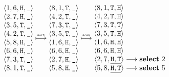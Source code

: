 \begin{align*}
  \begin{matrix}
    \langle 1, 6, \text{\tt H}, \text{\tt \_} \rangle \\
    \langle 2, 7, \text{\tt H}, \text{\tt \_} \rangle \\
    \langle 3, 5, \text{\tt T}, \text{\tt \_} \rangle \\
    \langle 4, 2, \text{\tt T}, \text{\tt \_} \rangle \\
    \langle 5, 8, \text{\tt H}, \text{\tt \_} \rangle \\
    \langle 6, 6, \text{\tt H}, \text{\tt \_} \rangle \\
    \langle 7, 3, \text{\tt T}, \text{\tt \_} \rangle \\
    \langle 8, 1, \text{\tt T}, \text{\tt \_} \rangle \\
  \end{matrix}
  \stackrel{\text{\tiny \tt sort}}{\longmapsto}
  \begin{matrix}
    \langle 8, 1, \text{\tt T}, \text{\tt \_} \rangle \\
    \langle 4, 2, \text{\tt T}, \text{\tt \_} \rangle \\
    \langle 7, 3, \text{\tt T}, \text{\tt \_} \rangle \\
    \langle 3, 5, \text{\tt T}, \text{\tt \_} \rangle \\
    \langle 1, 6, \text{\tt H}, \text{\tt \_} \rangle \\
    \langle 6, 6, \text{\tt H}, \text{\tt \_} \rangle \\
    \langle 2, 7, \text{\tt H}, \text{\tt \_} \rangle \\
    \langle 5, 8, \text{\tt H}, \text{\tt \_} \rangle \\
  \end{matrix}
  \stackrel{\text{\tiny \tt scan}}{\longmapsto}
  \begin{matrix}
    \langle 8, 1, \text{\tt T}, \text{\tt H} \rangle \phantom{\longrightarrow \text{\bf select}\ 2\ }\\
    \langle 4, 2, \text{\tt T}, \text{\tt H} \rangle \phantom{\longrightarrow \text{\bf select}\ 2\ }\\
    \langle 7, 3, \text{\tt T}, \text{\tt T} \rangle \phantom{\longrightarrow \text{\bf select}\ 2\ }\\
    \langle 3, 5, \text{\tt T}, \text{\tt H} \rangle \phantom{\longrightarrow \text{\bf select}\ 2\ }\\
    \langle 1, 6, \text{\tt H}, \text{\tt H} \rangle \phantom{\longrightarrow \text{\bf select}\ 2\ }\\
    \langle 6, 6, \text{\tt H}, \text{\tt H} \rangle \phantom{\longrightarrow \text{\bf select}\ 2\ }\\
    \langle 2, 7, \underline{\text{\tt H}, \text{\tt T}} \rangle \longrightarrow \text{\bf select}\ 2\\
    \langle 5, 8, \underline{\text{\tt H}, \text{\tt T}} \rangle \longrightarrow \text{\bf select}\ 5\\
  \end{matrix}
\end{align*}
